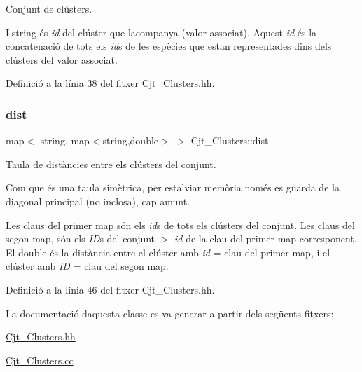 Conjunt de clústers. 

L\textquotesingle{}string és {\itshape id} del clúster que l\textquotesingle{}acompanya (valor associat). Aquest {\itshape id} és la concatenació de tots els {\itshape id}s de les espècies que estan representades dins dels clústers del valor associat. 

Definició a la línia 38 del fitxer Cjt\+\_\+\+Clusters.\+hh.

\mbox{\label{class_cjt___clusters_afde449634787205786301b40e053fe91}} 
\subsubsection{\texorpdfstring{dist}{dist}}
{\footnotesize\ttfamily map$<$ string, map$<$string,double$>$ $>$ Cjt\+\_\+\+Clusters\+::dist\hspace{0.3cm}{\ttfamily [private]}}



Taula de distàncies entre els clústers del conjunt. 

Com que és una taula simètrica, per estalviar memòria només es guarda de la diagonal principal (no inclosa), cap amunt.

Les claus del primer map són els {\itshape id}s de tots els clústers del conjunt. Les claus del segon map, són els {\itshape ID}s del conjunt $>$ {\itshape id} de la clau del primer map corresponent. El double és la distància entre el clúster amb {\itshape id} = clau del primer map, i el clúster amb {\itshape ID} = clau del segon map. 

Definició a la línia 46 del fitxer Cjt\+\_\+\+Clusters.\+hh.



La documentació d\textquotesingle{}aquesta classe es va generar a partir dels següents fitxers\+:\begin{DoxyCompactItemize}
\item 
\hyperlink{_cjt___clusters_8hh}{Cjt\+\_\+\+Clusters.\+hh}\item 
\hyperlink{_cjt___clusters_8cc}{Cjt\+\_\+\+Clusters.\+cc}\end{DoxyCompactItemize}
